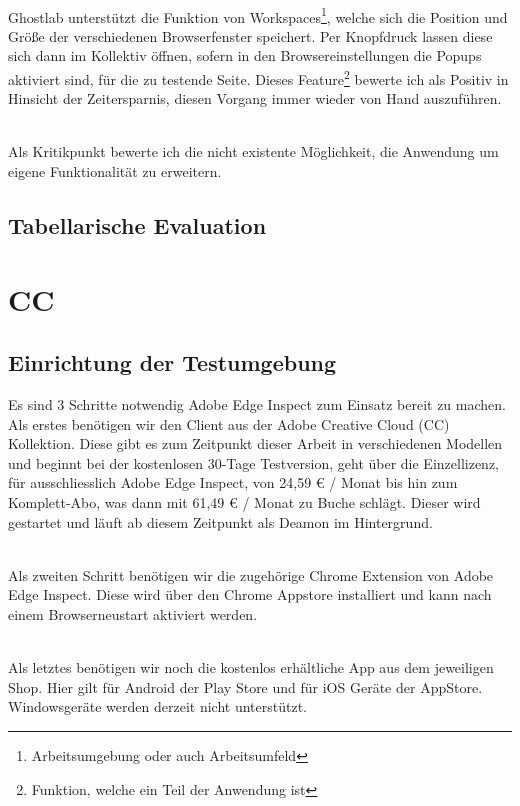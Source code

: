 		\\Ghostlab unterstützt die Funktion von Workspaces\footnote{Arbeitsumgebung oder auch Arbeitsumfeld}, welche sich die 		Position und Größe der verschiedenen Browserfenster speichert. Per Knopfdruck lassen diese sich dann im Kollektiv öffnen, 		sofern in den Browsereinstellungen die Popups aktiviert sind, für die zu testende Seite. Dieses Feature\footnote{Funktion, 			welche ein Teil der Anwendung ist} bewerte ich als Positiv in Hinsicht der Zeitersparnis, diesen Vorgang immer wieder von 		Hand auszuführen.

		\\Als Kritikpunkt bewerte ich die nicht existente Möglichkeit, die Anwendung um eigene Funktionalität zu erweitern.

		\subsection{Tabellarische Evaluation}
	
	\pagebreak
	\section{ CC }
		\subsection {Einrichtung der Testumgebung}
		Es sind 3 Schritte notwendig Adobe Edge Inspect zum Einsatz bereit zu machen. Als erstes benötigen wir den Client aus 		der Adobe Creative Cloud (CC) Kollektion. Diese gibt es zum Zeitpunkt dieser Arbeit in verschiedenen Modellen und 			beginnt bei der kostenlosen 30-Tage Testversion, geht über die Einzellizenz, für ausschliesslich Adobe Edge Inspect, von 			24,59 € / Monat bis hin zum Komplett-Abo, was dann mit 61,49 € / Monat zu Buche schlägt. Dieser wird gestartet und läuft 		ab diesem Zeitpunkt als Deamon im Hintergrund. 
		
		\\Als zweiten Schritt benötigen wir die zugehörige Chrome Extension von Adobe Edge Inspect. Diese wird über den Chrome 		Appstore installiert und kann nach einem Browserneustart aktiviert werden.
		
		\\Als letztes benötigen wir noch die kostenlos erhältliche App aus dem jeweiligen Shop. Hier gilt für Android der Play Store und		für iOS Geräte der AppStore. Windowsgeräte werden derzeit nicht unterstützt.
		
